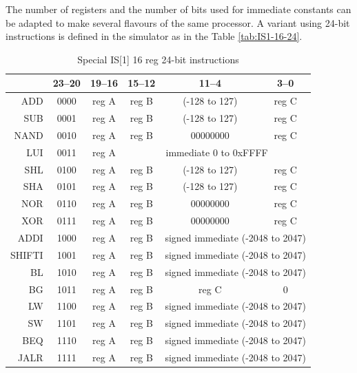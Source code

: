 \documentclass[10pt,a4paper]{article}
\theoremstyle{definition}%
\begin{document}
The number of registers and the number of bits used for immediate constants can be adapted to make several flavours of the same processor. A variant using 24-bit instructions is defined in the simulator as in the Table \vref{tab:IS1-16-24}.

\begin{table}[ht!]
	\begin{center}
		\begin{tabular}{r|c|c|c|c|c}%
		\toprule
		\diaghead{bourage~}{Instr}{ bit}	& 23--20  & 19--16  & {15--12}  & 11--4  & {3--0}\\
		\midrule
		ADD & 0000 & reg A & reg B & (-128 to 127) & {reg C} \\
		SUB & 0001 & reg A & reg B & (-128 to 127) & {reg C} \\
		NAND & 0010 & reg A & reg B & 00000000 & {reg C} \\ \cmidrule{4-6} %
		LUI & 0011 & reg A & \multicolumn{3}{c}{immediate 0 to 0xFFFF} \\ %
		\cmidrule{4-6}
		SHL & 0100 & reg A & reg B & (-128 to 127) & {reg C} \\
		SHA & 0101 & reg A & reg B & (-128 to 127) & {reg C} \\
		NOR & 0110 & reg A & reg B & 00000000 & {reg C} \\
		XOR & 0111 & reg A & reg B & 00000000 & {reg C} \\
		\cmidrule{5-6}
		ADDI & 1000 & reg A & reg B & \multicolumn{2}{c}{signed immediate (-2048 to 2047)} \\
		SHIFTI & 1001 & reg A & reg B & \multicolumn{2}{c}{signed immediate (-2048 to 2047)} \\
		BL & 1010 & reg A & reg B & \multicolumn{2}{c}{signed immediate (-2048 to 2047)} \\
		BG & 1011 & reg A & reg B & reg C & 0 \\
		LW& 1100 & reg A & reg B & \multicolumn{2}{c}{signed immediate (-2048 to 2047)} \\
		SW& 1101 & reg A & reg B & \multicolumn{2}{c}{signed immediate (-2048 to 2047)} \\
		BEQ & 1110 & reg A & reg B & \multicolumn{2}{c}{signed immediate (-2048 to 2047)} \\
		JALR & 1111 & reg A & reg B & \multicolumn{2}{c}{signed immediate (-2048 to 2047)} \\
		\bottomrule
		\end{tabular}
	\end{center}
\caption{Special IS[1] 16 reg 24-bit instructions}
\label{tab:IS1-16-24}
\end{table}
\end{document}
